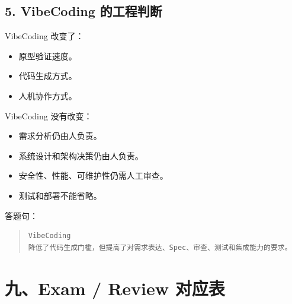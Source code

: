 \documentclass[UTF8,zihao=-4]{ctexart}
\begin{document}
\subsection{5. VibeCoding 的工程判断}

VibeCoding 改变了：

\begin{itemize}
\item 原型验证速度。
\item 代码生成方式。
\item 人机协作方式。
\end{itemize}

VibeCoding 没有改变：

\begin{itemize}
\item 需求分析仍由人负责。
\item 系统设计和架构决策仍由人负责。
\item 安全性、性能、可维护性仍需人工审查。
\item 测试和部署不能省略。
\end{itemize}

答题句：

\begin{quote}
\footnotesize
\begin{verbatim}
VibeCoding 
降低了代码生成门槛，但提高了对需求表达、Spec、审查、测试和集成能力的要求。
\end{verbatim}
\end{quote}

\section{九、Exam / Review 对应表}
\end{document}
